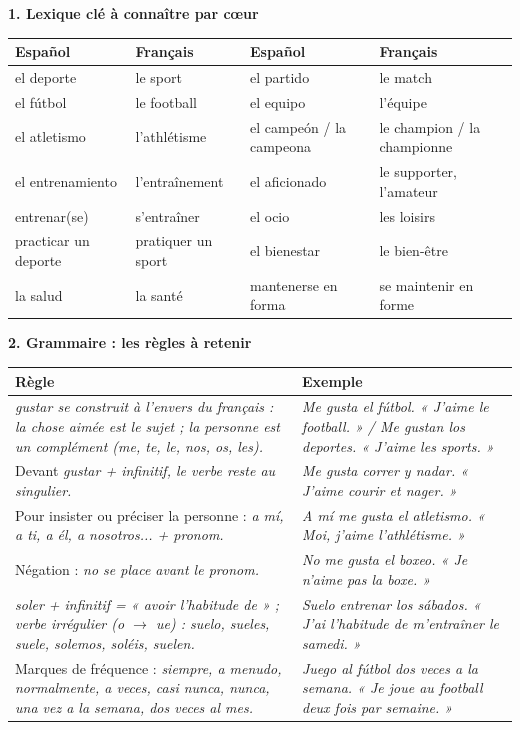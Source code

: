\documentclass[11pt]{article}
\newcommand{\esp}[1]{\ifmmode\text{\textit{#1}}\else\begingroup\selectlanguage{spanish}\itshape #1\endgroup\fi}
\begin{document}
\begin{bilan}
\textbf{1. Lexique clé à connaître par cœur}

\begin{center}
\begin{tabularx}{\linewidth}{|X|X|X|X|}
\hline
\rowcolor{popblueL} \textbf{Español} & \textbf{Français} & \textbf{Español} & \textbf{Français} \\
\hline
el deporte & le sport & el partido & le match \\
\hline
el fútbol & le football & el equipo & l'équipe \\
\hline
el atletismo & l'athlétisme & el campeón / la campeona & le champion / la championne \\
\hline
el entrenamiento & l'entraînement & el aficionado & le supporter, l'amateur \\
\hline
entrenar(se) & s'entraîner & el ocio & les loisirs \\
\hline
practicar un deporte & pratiquer un sport & el bienestar & le bien-être \\
\hline
la salud & la santé & mantenerse en forma & se maintenir en forme \\
\hline
\end{tabularx}
\end{center}

\textbf{2. Grammaire : les règles à retenir}

\begin{center}
\begin{tabularx}{\linewidth}{|X|X|}
\hline
\rowcolor{popgreenL} \textbf{Règle} & \textbf{Exemple} \\
\hline
\esp{gustar} se construit à l'envers du français : la chose aimée est le sujet ; la personne est un complément (\esp{me, te, le, nos, os, les}). & \esp{Me gusta el fútbol.} « J'aime le football. » / \esp{Me gustan los deportes.} « J'aime les sports. » \\
\hline
Devant \esp{gustar} + infinitif, le verbe reste au singulier. & \esp{Me gusta correr y nadar.} « J'aime courir et nager. » \\
\hline
Pour insister ou préciser la personne : \esp{a mí, a ti, a él, a nosotros...} + pronom. & \esp{A mí me gusta el atletismo.} « Moi, j'aime l'athlétisme. » \\
\hline
Négation : \esp{no} se place avant le pronom. & \esp{No me gusta el boxeo.} « Je n'aime pas la boxe. » \\
\hline
\esp{soler} + infinitif = « avoir l'habitude de » ; verbe irrégulier (o $\rightarrow$ ue) : \esp{suelo, sueles, suele, solemos, soléis, suelen}. & \esp{Suelo entrenar los sábados.} « J'ai l'habitude de m'entraîner le samedi. » \\
\hline
Marques de fréquence : \esp{siempre, a menudo, normalmente, a veces, casi nunca, nunca, una vez a la semana, dos veces al mes}. & \esp{Juego al fútbol dos veces a la semana.} « Je joue au football deux fois par semaine. » \\
\hline
\end{tabularx}
\end{center}


\end{bilan}
\end{document}
